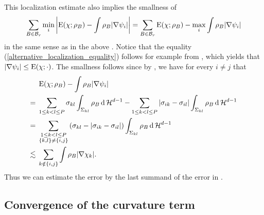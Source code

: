 \begin{remark}
	\label{localization_estimate_weaker}
	This localization estimate also implies the smallness of
	\begin{equation}
		\label{alternative_localization_equality}
		\sum_{ B \in \mathcal{ B }_{ r } }
		\min_{ i }
		\abs{
			\operatorname{E} ( \chi; \rho_{ B } )
			-
			\int
			\rho_{ B }
			\abs{ \nabla \psi_{ i } }
		}
		=
		\sum_{ B \in \mathcal{ B }_{ r } }
		\operatorname{E} ( \chi ; \rho_{ B } )
		-
		\max_{ i }
		\int
		\rho_{ B }
		\abs{ \nabla \psi_{ i } }
	\end{equation}
	in the same sense as in the above . 
	Notice that the equality (\ref{alternative_localization_equality}) follows 
	for example from 
	, which yields that $ \abs{ 
	\nabla 
		\psi_{ i } } \leq \operatorname{E} ( \chi ; \cdot )$. The smallness follows 
		since by 
	, we have for every $ i \neq j $ that
	\begin{align*}
		&
		\operatorname{E} ( \chi ; \rho_{ B } ) 
		-
		\int
		\rho_{ B }
		\abs{ \nabla \psi_{ i } }
		\\
		={} &
		\sum_{ 1 \leq k < l \leq P }
		\sigma_{ k l }
		\int_{ \Sigma_{ k l } }
		\rho_{ B }
		\dd{ \operatorname{\mathcal{H}}^{ d -1 } }
		-
		\sum_{ 1 \leq k < l \leq P }
		\abs{ \sigma_{ i k } - \sigma_{ i l } }
		\int_{ \Sigma_{ k l } }
		\rho_{ B }
		\dd{ \operatorname{\mathcal{H}}^{ d - 1 } }
		\\
		={} &
		\sum_{ \substack{1 \leq k < l \leq P \\ \{ k, l \} \neq \{ i, j \} } }
		\left(
		\sigma_{ k l } - \abs{ \sigma_{ i k } - \sigma_{ i l } }
		\right)
		\int_{ \Sigma_{ k l } }
		\rho_{ B }
		\dd{ \operatorname{\mathcal{H}}^{ d - 1 } }
		\\
		\lesssim{} &
		\sum_{ k \notin \{ i, j \} }
		\int
		\rho_{ B }
		\abs{ \nabla \chi_{ k } }.
	\end{align*}
	Thus we can estimate the error by the last summand of the error in 
	.
\end{remark}
\subsection{Convergence of the curvature term}

